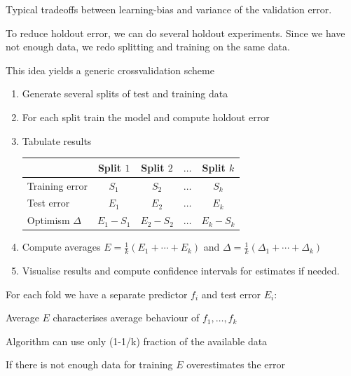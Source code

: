 \documentclass[landscape,footrule]{foils}
\begin{document}

\vspace*{-.5cm}
Typical tradeoffs between learning-bias and variance of the validation error.   


\enlargethispage{0.7cm}

To reduce holdout error, we can do several holdout experiments. 
Since we have not enough data, we redo splitting and training on the same data. 

This idea yields a generic crossvalidation scheme
\begin{enumerate}
\item Generate several splits of test and training data
\item For each split train the model and compute holdout error
\item Tabulate results\vspace*{2ex}
\begin{center}
\begin{tabular}{|l|c|c|c|c|}
\hline
 & Split $1$ & Split $2$ & $\ldots$ & Split $k$\\
 \hline
 Training error & $S_1$ & $S_2$ & $\ldots$ & $S_k$\\
 Test error     & $E_1$ & $E_2$ & $\ldots$ & $E_k$\\
\hline
 Optimism $\Delta$    & $E_1-S_1$ & $E_2-S_2$ & $\ldots$ & $E_k-S_k$\\
 \cline{2-5}
\hline
\end{tabular}
\end{center}
\vspace*{2ex}
\item Compute averages $E=\frac{1}{k}(E_1+\cdots+E_k)$ and $\Delta=\frac{1}{k}(\Delta_1+\cdots+\Delta_k)$
\item Visualise results and compute confidence intervals for estimates if needed. 
\end{enumerate}



For each fold we have a separate predictor $f_i$ and test error $E_i$:
\begin{triangles}
\item Average $E$ characterises average behaviour of $f_1,\ldots, f_k$
\item Algorithm can use only (1-1/k) fraction of the available data
\item If there is not enough data for training $E$ overestimates the error \vspace*{1cm}  
\end{triangles}
\end{document}
